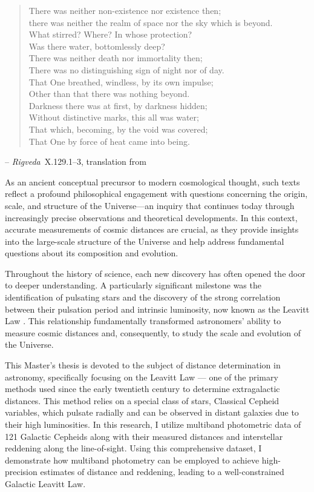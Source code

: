 \begin{quote}
{\small 
There was neither non-existence nor existence then; \\
there was neither the realm of space nor the sky which is beyond. \\
What stirred? Where? In whose protection? \\
Was there water, bottomlessly deep? \\

There was neither death nor immortality then;\\
There was no distinguishing sign of night nor of day. \\
That One breathed, windless, by its own impulse;\\
Other than that there was nothing beyond.\\

Darkness there was at first, by darkness hidden;\\
Without distinctive marks, this all was water;\\
That which, becoming, by the void was covered;\\
That One by force of heat came into being.}
\end{quote}
\hfill -- \textit{Rigveda}~X.129.1--3, translation from \citep{2011MapsOfTime}


As an ancient conceptual precursor to modern cosmological thought, such texts reflect a profound philosophical engagement with questions concerning the origin, scale, and structure of the Universe—an inquiry that continues today through increasingly precise observations and theoretical developments. In this context, accurate measurements of cosmic distances are crucial, as they provide insights into the large-scale structure of the Universe and help address fundamental questions about its composition and evolution.  

Throughout the history of science, each new discovery has often opened the door to deeper understanding. A particularly significant milestone was the identification of pulsating stars \citep{1785pigott, 1786john} and the discovery of the strong correlation between their pulsation period and intrinsic luminosity, now known as the Leavitt Law \citep{1908leavitt}. This relationship fundamentally transformed astronomers' ability to measure cosmic distances and, consequently, to study the scale and evolution of the Universe.




This Master’s thesis is devoted to the subject of distance determination in astronomy, specifically focusing on the Leavitt Law — one of the primary methods used since the early twentieth century to determine extragalactic distances. This method relies on a special class of stars, Classical Cepheid variables, which pulsate radially and can be observed in distant galaxies due to their high luminosities. In this research, I utilize multiband photometric data of 121 Galactic Cepheids along with their measured distances and interstellar reddening along the line-of-sight. Using this comprehensive dataset, I demonstrate how multiband photometry can be employed to achieve high-precision estimates of distance and reddening, leading to a well-constrained Galactic Leavitt Law.

